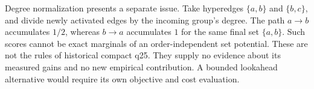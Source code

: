 \documentclass[11pt,a4paper]{article}
\begin{document}
Degree normalization presents a separate issue. Take hyperedges
$\{a,b\}$ and $\{b,c\}$, and divide newly activated edges by the incoming
group's degree. The path $a\rightarrow b$ accumulates $1/2$, whereas
$b\rightarrow a$ accumulates $1$ for the same final set $\{a,b\}$.
Such scores cannot be exact marginals of an order-independent set potential.
These are not the rules of historical compact q25. They supply no evidence
about its measured gains and no new empirical contribution. A bounded
lookahead alternative would require its own objective and cost evaluation.


\end{document}
